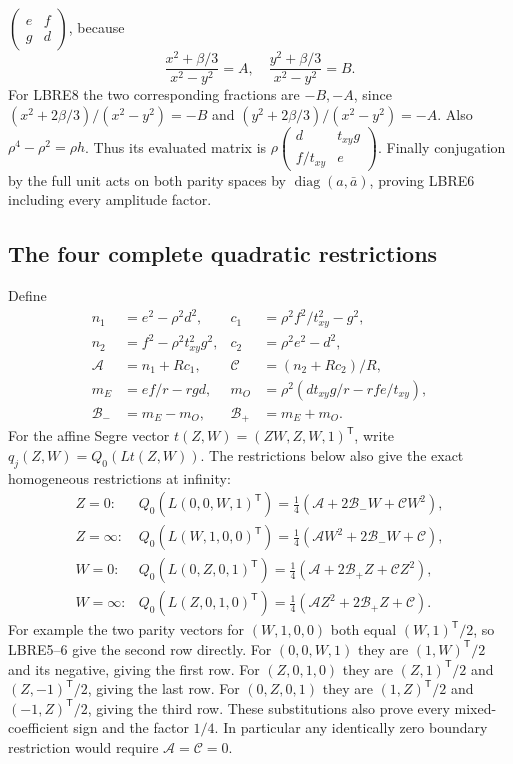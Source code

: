 \documentclass[11pt,a4paper]{article}
\begin{document}
$\left(\begin{smallmatrix}e&f\\g&d\end{smallmatrix}\right)$,
because
\[
 \frac{x^2+\beta/3}{x^2-y^2}=A,\quad
 \frac{y^2+\beta/3}{x^2-y^2}=B.
 \tag{LBRE9}
\]
For LBRE8 the two corresponding fractions are $-B,-A$, since
$(x^2+2\beta/3)/(x^2-y^2)=-B$ and
$(y^2+2\beta/3)/(x^2-y^2)=-A$. Also
$\rho^4-\rho^2=\rho h$. Thus its evaluated matrix is
$\rho\left(\begin{smallmatrix}d&t_{xy} g\\f/t_{xy}&e\end{smallmatrix}\right)$.
Finally conjugation by the full unit acts on both parity spaces
by $\operatorname{diag}(a,\bar a)$, proving LBRE6 including every
amplitude factor.

\subsection{The four complete quadratic restrictions}
Define
\[
 \begin{aligned}
 n_1&=e^2-\rho^2d^2,& c_1&=\rho^2f^2/t_{xy}^2-g^2,\\
 n_2&=f^2-\rho^2t_{xy}^2g^2,& c_2&=\rho^2e^2-d^2,\\
 \mathcal A&=n_1+Rc_1,&
 \mathcal C&=(n_2+Rc_2)/R,\\
 m_E&=ef/r-rgd,&
 m_O&=\rho^2(dt_{xy} g/r-rfe/t_{xy}),\\
 \mathcal B_-&=m_E-m_O,&\mathcal B_+&=m_E+m_O.
 \end{aligned}\tag{LBRE10}
\]
For the affine Segre vector $t(Z,W)=(ZW,Z,W,1)^{\mathsf T}$,
write $q_j(Z,W)=Q_0(Lt(Z,W))$. The restrictions below also give
the exact homogeneous restrictions at infinity:
\[
 \begin{array}{ll}
 Z=0:&Q_0(L(0,0,W,1)^{\mathsf T})
   =\tfrac14(\mathcal A+2\mathcal B_-W+\mathcal CW^2),\\[2pt]
 Z=\infty:&Q_0(L(W,1,0,0)^{\mathsf T})
   =\tfrac14(\mathcal AW^2+2\mathcal B_-W+\mathcal C),\\[2pt]
 W=0:&Q_0(L(0,Z,0,1)^{\mathsf T})
   =\tfrac14(\mathcal A+2\mathcal B_+Z+\mathcal CZ^2),\\[2pt]
 W=\infty:&Q_0(L(Z,0,1,0)^{\mathsf T})
   =\tfrac14(\mathcal AZ^2+2\mathcal B_+Z+\mathcal C).
 \end{array}\tag{LBRE11}
\]
For example the two parity vectors for $(W,1,0,0)$ both equal
$(W,1)^{\mathsf T}/2$, so LBRE5--6 give the second row directly.
For $(0,0,W,1)$ they are $(1,W)^{\mathsf T}/2$ and its negative,
giving the first row. For $(Z,0,1,0)$ they are
$(Z,1)^{\mathsf T}/2$ and $(Z,-1)^{\mathsf T}/2$, giving the
last row. For $(0,Z,0,1)$ they are $(1,Z)^{\mathsf T}/2$ and
$(-1,Z)^{\mathsf T}/2$, giving the third row. These substitutions
also prove every mixed-coefficient sign and the factor $1/4$.
In particular any identically zero boundary restriction would
require $\mathcal A=\mathcal C=0$.
\end{document}

